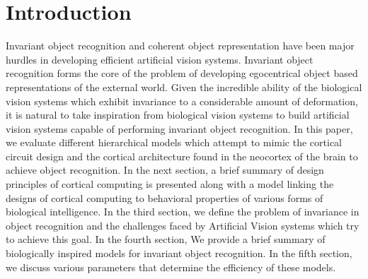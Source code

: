 \documentclass[12pt,twoside]{article}
\theoremstyle{plain}
\theoremstyle{definition}
\theoremstyle{remark}
\begin{document}
\setcounter{tocdepth}{2} 					%
\tableofcontents
{}
\clearpage



\section{Introduction}
\label{sec:introduction}
Invariant object recognition and coherent object representation have been major hurdles in developing efficient artificial vision systems. Invariant object recognition forms the core of the problem of developing egocentrical object based representations of the external world. Given the incredible ability of the biological vision systems which exhibit invariance to a considerable amount of deformation, it is natural to take inspiration from biological vision systems to build artificial vision systems capable of performing invariant object recognition. In this paper, we evaluate different hierarchical models which attempt to mimic the cortical circuit design and the cortical architecture found in the neocortex of the brain to achieve object recognition. In the next section, a brief summary of design principles of cortical computing is presented along with a model \cite{Grossberg2007} linking the designs of cortical computing to behavioral properties of various forms of biological intelligence. In the third section, we define the problem of invariance in object recognition\cite{rohtua} and the challenges faced by Artificial Vision systems which try to achieve this goal. In the fourth section, We provide a brief summary of biologically inspired models for invariant object recognition\cite{Fukushim1980}\cite{JimMutch2008}\cite{NicolasPinto2009}\cite{MarkusLessmann2014}\cite{ThomasSerre2007}\cite{XiaolinHu2014}. In the fifth section, we discuss various parameters that determine the efficiency of these models.
\end{document}
